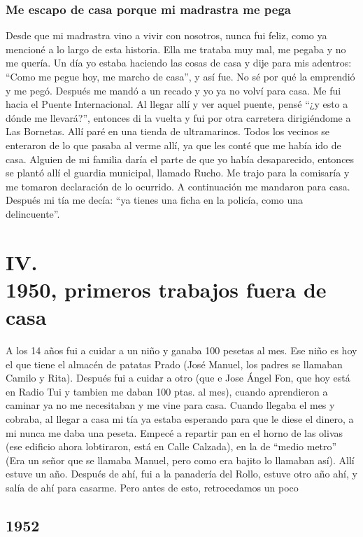 \documentclass[12pt,a5paper]{book}
\begin{document}
\subsubsection*{Me escapo de casa porque mi madrastra me pega}
Desde que mi madrastra vino a vivir con nosotros, nunca fui feliz, como ya mencioné a lo largo de esta historia. Ella me trataba muy mal, me pegaba y no me quería.
Un día yo estaba haciendo las cosas de casa y dije para mis adentros: “Como me pegue hoy, me marcho de casa”, y así fue. No sé por qué la emprendió y me pegó. Después me mandó a un recado y yo ya no volví para casa. Me fui hacia el Puente Internacional. Al llegar allí y ver aquel puente, pensé “¿y esto a dónde me llevará?”, entonces di la vuelta y fui por otra carretera dirigiéndome a Las Bornetas. Allí paré en una tienda de ultramarinos. Todos los vecinos se enteraron de lo que pasaba al verme allí, ya que les conté que me había ido de casa.
Alguien de mi familia daría el parte de que yo había desaparecido, entonces se plantó allí el guardia municipal, llamado Rucho. Me trajo para la comisaría y me tomaron declaración de lo ocurrido. A continuación me mandaron para casa. Después mi tía me decía: “ya tienes una ficha en la policía, como una delincuente”.



\section*{IV.\\1950, primeros trabajos fuera de casa}

A los 14 años fui a cuidar a un niño y ganaba 100 pesetas al mes. Ese niño es hoy el que tiene el almacén de patatas Prado (José Manuel, los padres se llamaban Camilo y Rita). Después fui a cuidar a otro (que e Jose Ángel Fon, que hoy está en Radio Tui y tambien me daban 100 ptas. al mes), cuando aprendieron a caminar ya no me necesitaban y me vine para casa. Cuando llegaba el mes y cobraba, al llegar a casa mi tía ya estaba esperando para que le diese el dinero, a mi nunca me daba una peseta.
Empecé a repartir pan en el horno de las olivas (ese edificio ahora lobtiraron, está en Calle Calzada), en la de “medio metro” (Era un señor que se llamaba Manuel, pero como era bajito lo llamaban así). Allí estuve un año. Después de ahí, fui a la panadería del Rollo, estuve otro año ahí, y salía de ahí para casarme. Pero antes de esto, retrocedamos un poco



\subsection*{1952}
\end{document}
